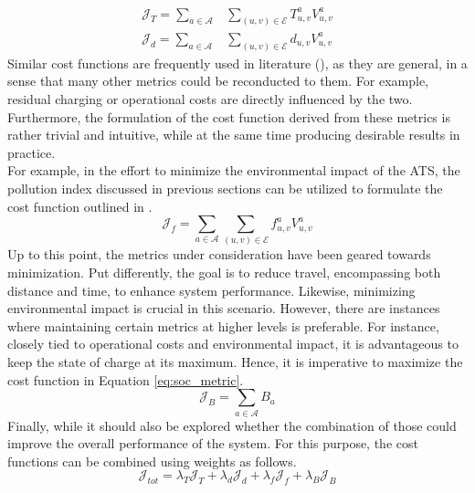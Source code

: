 \begin{align}
	\mathcal{J}_T = \sum_{a \in \mathcal{A}} &\sum_{(u, v) \in \mathcal{E}} T^a_{ u,v} V^a_{u,v} \label{eq:travel_time_routing}\\
	\mathcal{J}_d = \sum_{a \in \mathcal{A}} &\sum_{(u, v) \in \mathcal{E}} d_{ u,v} V^a_{u,v}\label{eq:distance_time_routing}
\end{align} 
Similar cost functions are frequently used in literature (\cite{7579135}), as they are general, in a sense that many other metrics could be reconducted to them. For example, residual charging or operational costs are directly influenced by the two. Furthermore, the formulation of the cost function derived from these metrics is rather trivial and intuitive, while at the same time producing desirable results in practice. \\
For example, in the effort to minimize the environmental impact of the ATS, the pollution index discussed in previous sections can be utilized to formulate the cost function outlined in .
\begin{equation}
	\mathcal{J}_f =\sum_{a \in \mathcal{A}} \sum_{(u, v) \in \mathcal{E}} f^a_{ u,v} V^a_{u,v} 
	\label{eq:pollution_metric}
\end{equation} 
Up to this point, the metrics under consideration have been geared towards minimization. Put differently, the goal is to reduce travel, encompassing both distance and time, to enhance system performance. Likewise, minimizing environmental impact is crucial in this scenario. However, there are instances where maintaining certain metrics at higher levels is preferable. For instance, closely tied to operational costs and environmental impact, it is advantageous to keep the state of charge at its maximum. Hence, it is imperative to maximize the cost function in Equation \ref{eq:soc_metric}.
\begin{equation}
	\mathcal{J}_B =\sum_{a \in \mathcal{A}}  B_a 
	\label{eq:soc_metric}
\end{equation} 
Finally, while it should also be explored whether the combination of those could improve the overall performance of the system. For this purpose, the cost functions can be combined using weights as follows.  
\begin{equation}
	\mathcal{J}_{tot} = \lambda_T\mathcal{J}_T +\lambda_d\mathcal{J}_d +\lambda_f\mathcal{J}_f +\lambda_B\mathcal{J}_B 
	\label{eq:combined_metrics}
\end{equation} \\
